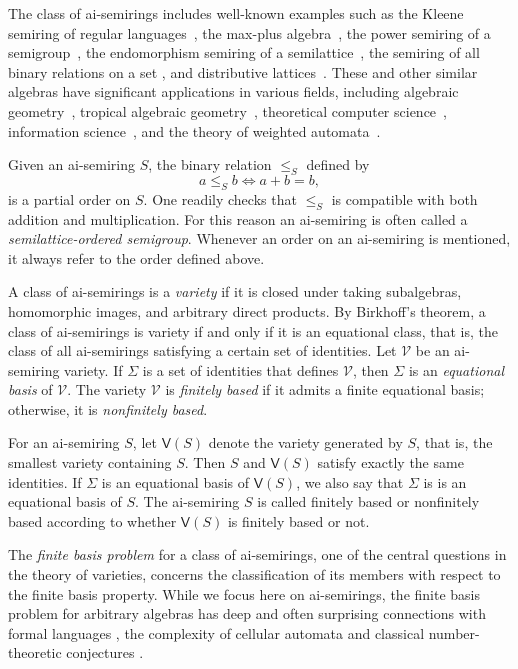 \documentclass[reqno]{amsart}
\theoremstyle{plain}
\theoremstyle{definition}
\begin{document}
The class of ai-semirings includes
well-known examples such as the Kleene semiring of regular languages~\cite{con},
the max-plus algebra~\cite{aei}, the power semiring of a semigroup~\cite{dgv24},
the endomorphism semiring of a semilattice~\cite{dgv25},
the semiring of all binary relations on a set \cite{dolinka}, and distributive lattices~\cite{bs}.
These and other similar algebras have significant applications in various fields,
including algebraic geometry~\cite{cc}, tropical algebraic geometry~\cite{ms},
theoretical computer science~\cite{go}, information science~\cite{gl}, and the theory of weighted automata~\cite{dkv}.

Given an ai-semiring $S$, the binary relation $\leq_S$ defined by
\[
a \leq_S b \Leftrightarrow a+b=b,
\]
is a partial order on $S$.
One readily checks that $\leq_S$ is compatible with both addition and multiplication.
For this reason an ai-semiring is often called a \emph{semilattice-ordered semigroup}.
Whenever an order on an ai-semiring is mentioned, it always refer to the order defined above.

A class of ai-semirings is a \emph{variety} if it is closed under taking subalgebras,
homomorphic images, and arbitrary direct products.
By Birkhoff's theorem, a class of ai-semirings is variety if and only if
it is an equational class, that is, the class of all ai-semirings satisfying a certain set of identities.
Let $\mathcal{V}$ be an ai-semiring variety.
If $\Sigma$ is a set of identities that defines $\mathcal{V}$,
then $\Sigma$ is an \emph{equational basis} of $\mathcal{V}$.
The variety $\mathcal{V}$ is \emph{finitely based} if it admits a finite equational basis;
otherwise, it is \emph{nonfinitely based}.

For an ai-semiring $S$, let $\mathsf{V}(S)$ denote the variety generated by $S$,
that is, the smallest variety containing $S$.
Then $S$ and $\mathsf{V}(S)$ satisfy exactly the same identities.
If $\Sigma$ is an equational basis of $\mathsf{V}(S)$, we also say that $\Sigma$ is is an equational basis of $S$.
The ai-semiring $S$ is called finitely based or nonfinitely based according to whether $\mathsf{V}(S)$ is finitely based or not.

The \emph{finite basis problem} for a class of ai-semirings,
one of the central questions in the theory of varieties,
concerns the classification of its members with respect to the finite basis property.
While we focus here on ai-semirings, the finite basis problem for arbitrary algebras
has deep and often surprising connections with
formal languages \cite{Almeida}, the complexity of cellular automata \cite{Gulak} and
classical number-theoretic conjectures \cite{Perkins}.
\end{document}
